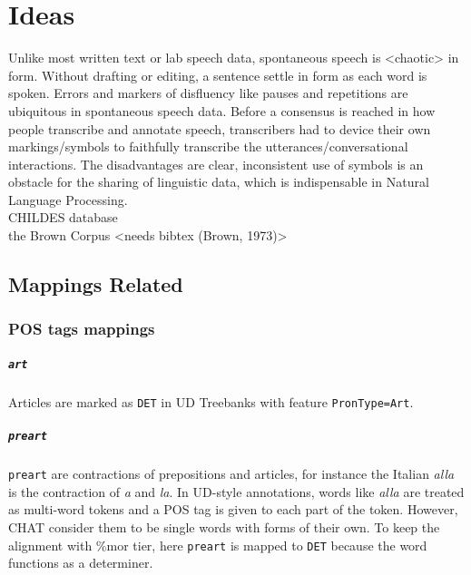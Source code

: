 \chapter{Ideas} %

\label{Chapter7} %

Unlike most written text or lab speech data, spontaneous speech is <chaotic> in form. Without drafting or editing, a sentence settle in form as each word is spoken. Errors and markers of disfluency like pauses and repetitions are ubiquitous in spontaneous speech data. Before a consensus is reached in how people transcribe and annotate speech, transcribers had to device their own markings/symbols to faithfully transcribe the utterances/conversational interactions. The disadvantages are clear, inconsistent use of symbols is an obstacle for the sharing of linguistic data, which is indispensable in Natural Language Processing.\\

CHILDES database \cite{Macwhinney2000}\\
the Brown Corpus <needs bibtex (Brown, 1973)>\\

\section{Mappings Related} %
\label{sec:mappings}

\subsection{POS tags mappings}

\paragraph{\texttt{art}}
Articles are marked as \texttt{DET} in UD Treebanks with feature \texttt{PronType=Art}.\\
\paragraph{\texttt{preart}}
\texttt{preart} are contractions of prepositions and articles, for instance the Italian \emph{alla} is the contraction of \emph{a} and \emph{la}. In UD-style annotations, words like \emph{alla} are treated as multi-word tokens and a POS tag is given to each part of the token. However, CHAT consider them to be single words with forms of their own. To keep the alignment with \%mor tier, here \texttt{preart} is mapped to \texttt{DET} because the word functions as a determiner.\\ 

